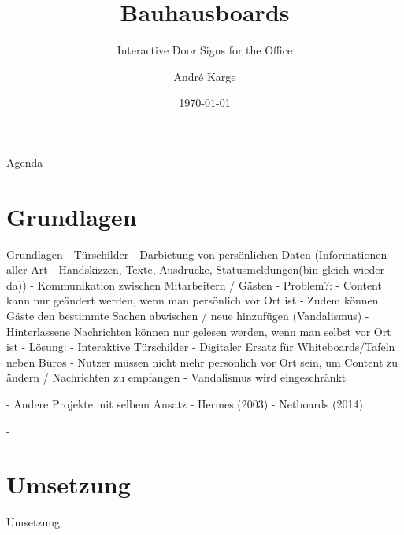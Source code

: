 \documentclass[11pt]{beamer}
\title[Bauhausboards]{Bauhausboards}
\subtitle{Interactive Door Signs for the Office}
\author[André Karge]{André Karge}
\institute[Bauhaus-Universität Weimar]{}
\date[\today]{\today}
\begin{document}

\maketitle

\begin{frame}{Agenda}
\tableofcontents
\end{frame}

\section{Grundlagen}
\begin{frame}{Grundlagen}
  - Türschilder
    - Darbietung von persönlichen Daten (Informationen aller Art - Handskizzen, Texte, Ausdrucke, Statusmeldungen(bin gleich wieder da))
    - Kommunikation zwischen Mitarbeitern / Gästen
  - Problem?:
    - Content kann nur geändert werden, wenn man persönlich vor Ort ist
    - Zudem können Gäste den bestimmte Sachen abwischen / neue hinzufügen (Vandalismus)
    - Hinterlassene Nachrichten können nur gelesen werden, wenn man selbst vor Ort ist
  - Lösung:
    - Interaktive Türschilder
    - Digitaler Ersatz für Whiteboards/Tafeln neben Büros
    - Nutzer müssen nicht mehr persönlich vor Ort sein, um Content zu ändern / Nachrichten zu empfangen
    - Vandalismus wird eingeschränkt

  - Andere Projekte mit selbem Ansatz
    - Hermes (2003)
    - Netboards (2014)

  - 
\end{frame}
\section{Umsetzung}
\begin{frame}{Umsetzung}
\end{frame}
\end{document}
